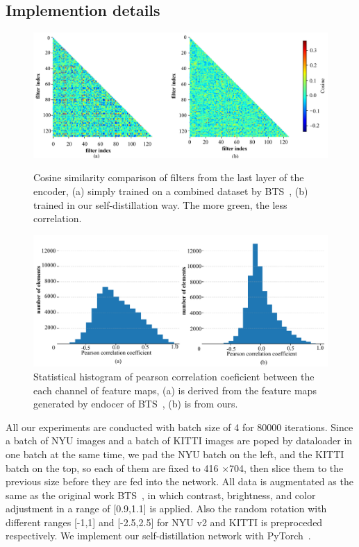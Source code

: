 \documentclass{svjour3}                     %
\begin{document}
\subsection{Implemention details}
\begin{figure}[t]
  \centering
  \includegraphics[width=0.85\linewidth]{images/conv_co.pdf}
  \caption{Cosine similarity comparison of filters from the last layer of the 
  encoder, (a) simply trained on a combined dataset by BTS~\cite{bts}, (b) trained in our 
  self-distillation way. The more green, the less correlation.}
  \label{fig:conv_co}
  \includegraphics[width=0.85\linewidth]{images/fea_co.pdf}
  \caption{Statistical histogram of pearson correlation coeficient between the each
  channel of feature maps, (a) is derived from the feature maps generated by endocer of BTS~\cite{bts}, (b) is from ours.}
  \label{fig:fea_co}
\end{figure}
All our experiments are conducted with batch size of 4 for 80000 iterations. Since a batch of NYU images and a batch of KITTI images are poped by dataloader in one batch at the same time, we pad the NYU batch on the left, and the KITTI batch on the top, so each of them are fixed to 416 ×704, then slice them to the previous size before they are fed into the network. All data is augmentated as the same as the original work BTS~\cite{bts}, in which contrast, brightness, and color adjustment in a range of [0.9,1.1] is applied. Also the random rotation with different ranges [-1,1] and [-2.5,2.5] for NYU v2 and KITTI is preproceded respectively. We implement our self-distillation network with PyTorch~\cite{paszke2019pytorch}.
\vspace{-1cm}
\end{document}
